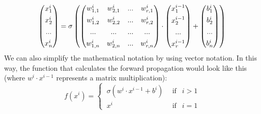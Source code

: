 \documentclass[../main]{subfiles}
\begin{document}
\begin{equation*}
\begin{pmatrix}
x_{1}^i \vspace{0.15cm}\\ 
x_{2}^i \vspace{0.15cm}\\ 
...     \vspace{0.15cm}\\
x_{n}^i
\end{pmatrix} = \sigma \left(
\begin{pmatrix}
w_{1,1}^i & w_{2,1}^i & ... & w_{r,1}^i\vspace{0.15cm}\\ 
w_{1,2}^i & w_{2,2}^i & ... & w_{r,2}^i\vspace{0.15cm}\\ 
...       & ...       & ... & ...\vspace{0.15cm}\\
w_{1,n}^i & w_{2,n}^i & ... & w_{r,n}^i
\end{pmatrix}\cdot
\begin{pmatrix}
x_{1}^{i-1} \vspace{0.15cm}\\ 
x_{2}^{i-1} \vspace{0.15cm}\\ 
...     \vspace{0.15cm}\\
x_{r}^{i-1}
\end{pmatrix}+
\begin{pmatrix}
b_{1}^{i} \vspace{0.15cm}\\ 
b_{2}^{i} \vspace{0.15cm}\\ 
...     \vspace{0.15cm}\\
b_{n}^{i}
\end{pmatrix}\right)
\end{equation*}
We can also simplify the mathematical notation by using vector notation. In this way, the function that calculates the forward propagation would look like this (where $w^i \cdot x^{i-1}$ represents a matrix multiplication):
\begin{equation*}
    f(x^i) = \begin{cases}
  \ \sigma(w^i\cdot x^{i-1}+b^i) \ \ & \text{if } \ \ i > 1 \\
  \ x^i \ & \text{if } \ \ i = 1
\end{cases}
\end{equation*}
\end{document}
